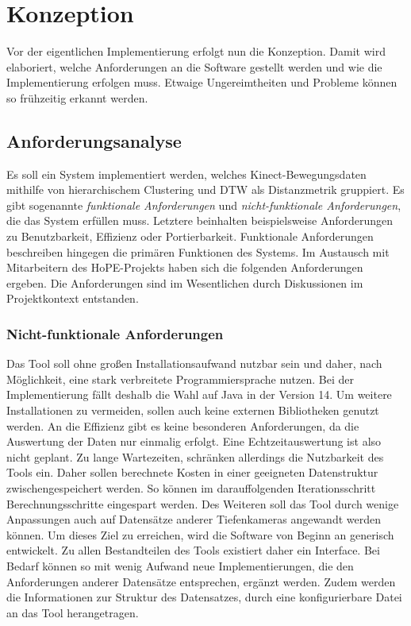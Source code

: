 \chapter{Konzeption}
\label{chapter4}
Vor der eigentlichen Implementierung erfolgt nun die Konzeption.
Damit wird elaboriert, welche Anforderungen an die Software gestellt werden
und wie die Implementierung erfolgen muss.
Etwaige Ungereimtheiten und Probleme können so frühzeitig erkannt werden.

\section{Anforderungsanalyse}
\label{4-Anforderungsanalyse}
Es soll ein System implementiert werden,
welches Kinect-Bewegungsdaten mithilfe von hierarchischem Clustering
und \ac{DTW} als Distanzmetrik gruppiert.
Es gibt sogenannte \emph{funktionale Anforderungen} und \emph{nicht-funktionale Anforderungen},
die das System erfüllen muss.
Letztere beinhalten beispielsweise Anforderungen zu Benutzbarkeit, Effizienz oder Portierbarkeit.
Funktionale Anforderungen beschreiben hingegen die primären Funktionen des Systems.
Im Austausch mit Mitarbeitern des HoPE-Projekts haben sich die folgenden Anforderungen ergeben.
Die Anforderungen sind im Wesentlichen durch Diskussionen im Projektkontext entstanden.

\subsection{Nicht-funktionale Anforderungen}
\label{4-NichtFunktionaleAnforderungen}
Das Tool soll ohne großen Installationsaufwand nutzbar sein
und daher, nach Möglichkeit, eine stark verbreitete Programmiersprache nutzen.
Bei der Implementierung fällt deshalb die Wahl auf Java in der Version 14.
Um weitere Installationen zu vermeiden, sollen auch keine externen Bibliotheken genutzt werden.
An die Effizienz gibt es keine besonderen Anforderungen,
da die Auswertung der Daten nur einmalig erfolgt.
Eine Echtzeitauswertung ist also nicht geplant.
Zu lange Wartezeiten, schränken allerdings die Nutzbarkeit des Tools ein.
Daher sollen berechnete Kosten in einer geeigneten Datenstruktur zwischengespeichert werden.
So können im darauffolgenden Iterationsschritt Berechnungsschritte eingespart werden.
Des Weiteren soll das Tool durch wenige Anpassungen auch auf Datensätze anderer Tiefenkameras angewandt werden können.
Um dieses Ziel zu erreichen, wird die Software von Beginn an generisch entwickelt.
Zu allen Bestandteilen des Tools existiert daher ein Interface.
Bei Bedarf können so mit wenig Aufwand neue Implementierungen,
die den Anforderungen anderer Datensätze entsprechen, ergänzt werden.
Zudem werden die Informationen zur Struktur des Datensatzes,
durch eine konfigurierbare Datei an das Tool herangetragen.

